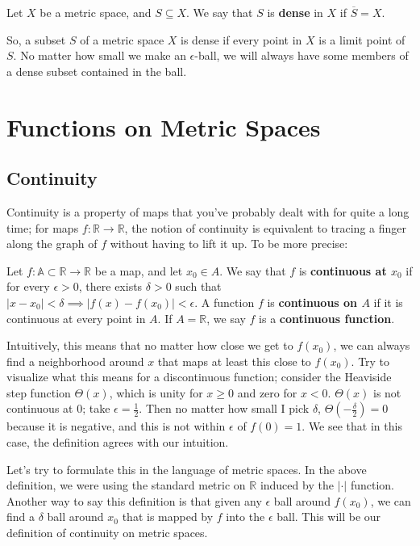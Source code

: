 	\begin{definition}
		Let $X$ be a metric space, and $S\subseteq X$. We say that $S$ is \textbf{dense} in $X$ if $\overline{S} = X$. 
	\end{definition}
	
	So, a subset $S$ of a metric space $X$ is dense if every point in $X$ is a limit point of $S$. No matter how small we make an $\epsilon$-ball, we will always 
	have some members of a dense subset contained in the ball.
	
\newpage
\section{Functions on Metric Spaces}

	\subsection{Continuity}

	Continuity is a property of maps that you've probably dealt with for quite a long time; for maps $f : \mathbb R\rightarrow\mathbb R$, the notion of continuity 
	is equivalent to tracing a finger along the graph of $f$ without having to lift it up. To be more precise:
	
	\begin{definition}
		Let $f : \mathbb A\subset\mathbb R\rightarrow \mathbb R$ be a map, and let $x_0\in A$. We say that $f$ is \textbf{continuous at $x_0$} if for every 
		$\epsilon > 0$, there exists $\delta > 0$ such that $|x - x_0| < \delta\implies |f(x) - f(x_0)| < \epsilon$. A function $f$ is \textbf{continuous on $A$} if 
		it is continuous at every point in $A$. If $A = \mathbb R$, we say $f$ is a \textbf{continuous function}.
	\end{definition}
	
	Intuitively, this means that no matter how close we get to $f(x_0)$, we can always find a neighborhood around $x$ that maps at least this close to $f(x_0)$. 
	Try to visualize what this means for a discontinuous function; consider the Heaviside step function $\Theta(x)$, which is unity for $x \geq 0$ and zero for $x
	< 0$. $\Theta(x)$ is not continuous at $0$; take $\epsilon = \frac{1}{2}$. Then no matter how small I pick $\delta$, $\Theta(-\frac{\delta}{2}) = 0$ because it 
	is negative, and this is not within $\epsilon$ of $f(0) = 1$. We see that in this case, the definition agrees with our intuition.
	
	Let's try to formulate this in the language of metric spaces. In the above definition, we were using the standard metric on $\mathbb R$ induced by the 
	$|\cdot|$ function. Another way to say this definition is that given any $\epsilon$ ball around $f(x_0)$, we can find a $\delta$ ball around $x_0$ that is 
	mapped by $f$ into the $\epsilon$ ball. This will be our definition of continuity on metric spaces.
	
